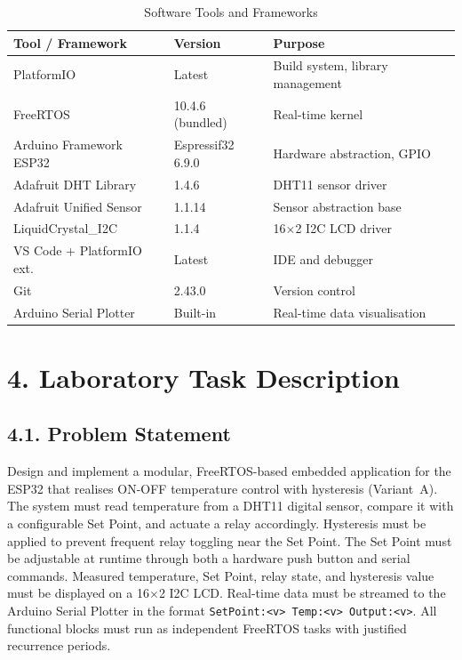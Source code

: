 \documentclass[12pt]{article}
\begin{document}
\begin{table}[H]
    \centering
    \caption{Software Tools and Frameworks}
    \label{tab:software-resources}
    \begin{tabular}{|l|l|l|}
        \hline
        \textbf{Tool / Framework} & \textbf{Version} & \textbf{Purpose} \\
        \hline
        PlatformIO & Latest & Build system, library management \\
        \hline
        FreeRTOS & 10.4.6 (bundled) & Real-time kernel \\
        \hline
        Arduino Framework ESP32 & Espressif32 6.9.0 & Hardware abstraction, GPIO \\
        \hline
        Adafruit DHT Library & 1.4.6 & DHT11 sensor driver \\
        \hline
        Adafruit Unified Sensor & 1.1.14 & Sensor abstraction base \\
        \hline
        LiquidCrystal\_I2C & 1.1.4 & 16$\times$2 I2C LCD driver \\
        \hline
        VS Code + PlatformIO ext. & Latest & IDE and debugger \\
        \hline
        Git & 2.43.0 & Version control \\
        \hline
        Arduino Serial Plotter & Built-in & Real-time data visualisation \\
        \hline
    \end{tabular}
\end{table}

\section*{4. Laboratory Task Description}

\subsection*{4.1. Problem Statement}

Design and implement a modular, FreeRTOS-based embedded application for the ESP32
that realises ON-OFF temperature control with hysteresis (Variant~A). The system
must read temperature from a DHT11 digital sensor, compare it with a configurable
Set Point, and actuate a relay accordingly. Hysteresis must be applied to prevent
frequent relay toggling near the Set Point. The Set Point must be adjustable at
runtime through both a hardware push button and serial commands. Measured
temperature, Set Point, relay state, and hysteresis value must be displayed on a
16$\times$2 I2C LCD. Real-time data must be streamed to the Arduino Serial Plotter
in the format \texttt{SetPoint:<v> Temp:<v> Output:<v>}. All functional blocks
must run as independent FreeRTOS tasks with justified recurrence periods.
\end{document}
